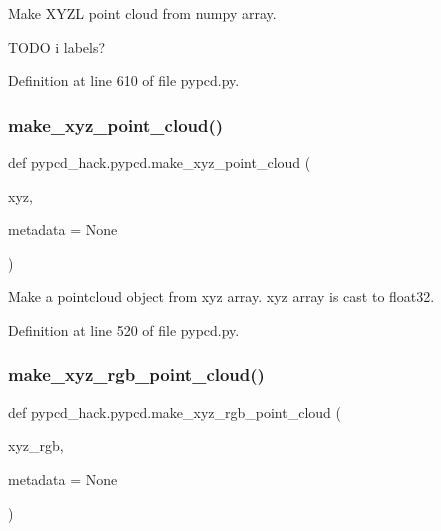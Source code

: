 \begin{DoxyVerb}Make XYZL point cloud from numpy array.

TODO i labels?
\end{DoxyVerb}
 

Definition at line 610 of file pypcd.\+py.

\mbox{\label{namespacepypcd__hack_1_1pypcd_a577a54423f71a8d86e80d7b15ded09aa}} 
\subsubsection{\texorpdfstring{make\+\_\+xyz\+\_\+point\+\_\+cloud()}{make\_xyz\_point\_cloud()}}
{\footnotesize\ttfamily def pypcd\+\_\+hack.\+pypcd.\+make\+\_\+xyz\+\_\+point\+\_\+cloud (\begin{DoxyParamCaption}\item[{}]{xyz,  }\item[{}]{metadata = {\ttfamily None} }\end{DoxyParamCaption})}

\begin{DoxyVerb}Make a pointcloud object from xyz array.
xyz array is cast to float32.
\end{DoxyVerb}
 

Definition at line 520 of file pypcd.\+py.

\mbox{\label{namespacepypcd__hack_1_1pypcd_a03097a8bbe76827f519fe2f960f37e19}} 
\subsubsection{\texorpdfstring{make\+\_\+xyz\+\_\+rgb\+\_\+point\+\_\+cloud()}{make\_xyz\_rgb\_point\_cloud()}}
{\footnotesize\ttfamily def pypcd\+\_\+hack.\+pypcd.\+make\+\_\+xyz\+\_\+rgb\+\_\+point\+\_\+cloud (\begin{DoxyParamCaption}\item[{}]{xyz\+\_\+rgb,  }\item[{}]{metadata = {\ttfamily None} }\end{DoxyParamCaption})}

